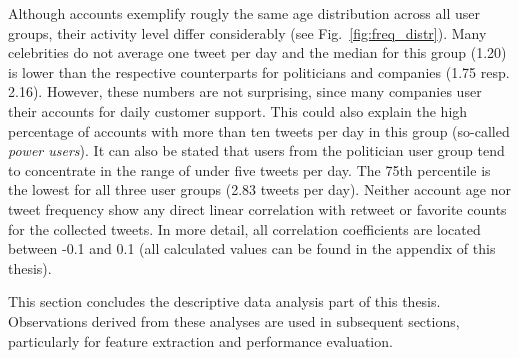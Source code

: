 Although accounts exemplify rougly the same age distribution across all user
groups, their activity level differ considerably (see Fig.~\ref{fig:freq_distr}).
Many celebrities do not average one tweet per day and the median for this group (1.20)
is lower than the respective counterparts for politicians and companies (1.75 resp. 2.16).
However, these numbers are not surprising, since many companies user their accounts
for daily customer support.
This could also explain the high percentage of accounts with more than ten tweets
per day in this group (so-called \textit{power users}).
It can also be stated that users from the politician user group tend to concentrate
in the range of under five tweets per day.
The 75th percentile is the lowest for all three user groups (2.83 tweets per day).
Neither account age nor tweet frequency show any direct linear correlation with
retweet or favorite counts for the collected tweets.
In more detail, all correlation coefficients are located between -0.1 and 0.1 (all
calculated values can be found in the appendix of this thesis).

This section concludes the descriptive data analysis part of this thesis.
Observations derived from these analyses are used in subsequent sections,
particularly for feature extraction and performance evaluation.
